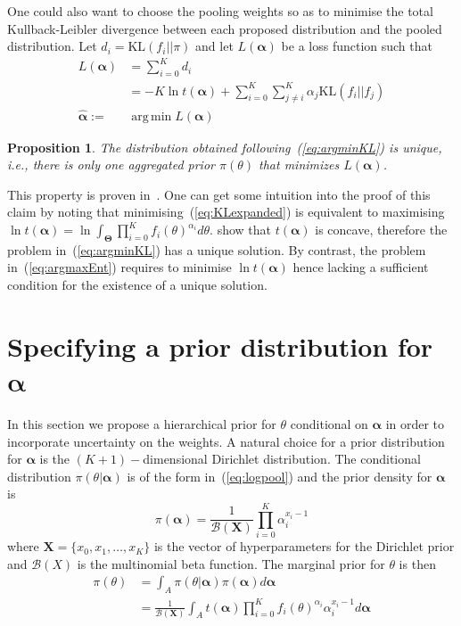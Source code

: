 \documentclass[a4paper, notitlepage, 11pt]{article}
\DeclareMathOperator*{\argmin}{arg\,min}
\newtheorem{proposition}{Proposition}[]
\begin{document}
One could also want to choose the pooling weights so as to minimise the total Kullback-Leibler divergence between each proposed distribution and the pooled distribution.
Let $d_i = \text{KL}(f_i || \pi)$ and let $L(\boldsymbol\alpha)$ be a loss function such that
\begin{align}
L(\boldsymbol\alpha) &= \sum_{i=0}^Kd_i \\
\label{eq:KLexpanded}
     &= -K\ln t(\boldsymbol\alpha) + \sum_{i=0}^K\sum_{j\neq i}^K\alpha_j\text{KL}(f_i||f_j) \\
     \label{eq:argminKL}
     \hat{\boldsymbol\alpha}:=& \argmin L(\boldsymbol\alpha)   
\end{align}

\begin{proposition}
\label{prop:uniqueness}
 The distribution obtained following~(\ref{eq:argminKL}) is unique, i.e., there is only one aggregated prior $\pi(\theta)$ that minimizes $L(\boldsymbol\alpha)$.
\end{proposition}
This property is proven in~\cite{rufo2012A}.
One can get some intuition into the proof  of this claim by noting that minimising~(\ref{eq:KLexpanded}) is equivalent to maximising $\ln t(\boldsymbol\alpha) = \ln\int_{\boldsymbol\Theta}\prod_{i=0}^{K}f_i(\theta)^{\alpha_i}d\theta$. 
\cite{rufo2012A} show that $t(\boldsymbol\alpha)$ is concave, therefore the problem in~(\ref{eq:argminKL}) has a unique solution.
By contrast, the problem in~(\ref{eq:argmaxEnt}) requires to minimise $\ln t(\boldsymbol\alpha)$ hence lacking a sufficient condition for the existence of a unique solution.

\section*{Specifying a prior distribution for $\boldsymbol\alpha$}

In this section we propose a hierarchical prior for $\theta$ conditional on $\boldsymbol\alpha$ in order to incorporate uncertainty on the weights.
A natural choice for a prior distribution for $\boldsymbol\alpha$ is the $(K+1)-$dimensional Dirichlet distribution.
The conditional distribution $\pi(\theta|\boldsymbol\alpha)$ is of the form in~(\ref{eq:logpool}) and the prior density for $\boldsymbol\alpha$ is 
\begin{equation}
 \label{eq:generalcondprior}
 \pi(\boldsymbol\alpha) = \frac{1}{\mathcal{B}(\boldsymbol X)}\prod_{i=0}^K \alpha_i^{x_i-1}
\end{equation}
where $\boldsymbol X = \{ x_0, x_1, \ldots, x_K\}$ is the vector of hyperparameters for the Dirichlet prior and $\mathcal{B}(X)$ is the multinomial beta function.
The marginal prior for $\theta$ is then
\begin{align}
 \label{eq:marginalhierprior}
 \pi(\theta) &= \int_{A}\pi(\theta|\boldsymbol\alpha)\pi(\boldsymbol\alpha)d\boldsymbol\alpha \\
             &= \frac{1}{\mathcal{B}(\boldsymbol X)}\int_{A}t(\boldsymbol\alpha)\prod_{i=0}^K f_i(\theta)^{\alpha_i}\alpha_i^{x_i-1}d\boldsymbol\alpha 
\end{align}
\end{document}
